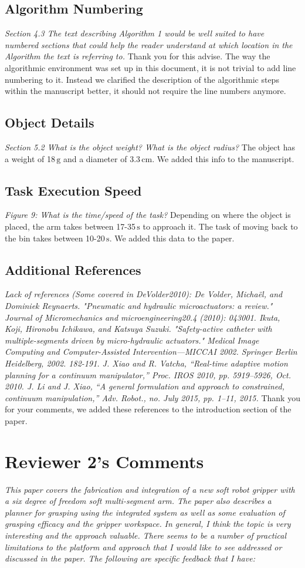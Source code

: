 \documentclass[letterpaper, 10 pt, twocolumn, conference]{article}
\newcommand{\unit}[1]{\ensuremath{\, \mathrm{#1}}} %
\begin{document}
\subsection{Algorithm Numbering}
\textit{Section 4.3 The text describing Algorithm 1 would be well suited to have numbered sections that could help the reader understand at which location in the Algorithm the text is referring to.}
%
Thank you for this advise. The way the algorithmic environment was set up in this document, it is not trivial to add line numbering to it. Instead we clarified the description of the algorithmic steps within the manuscript better, it should not require the line numbers anymore. 
%
\subsection{Object Details}
\textit{Section 5.2 What is the object weight? What is the object radius?}
%
The object has a weight of 18\unit{g} and a diameter of 3.3\unit{cm}. We added this info to the manuscript.
%
\subsection{Task Execution Speed}
\textit{Figure 9: What is the time/speed of the task?}
%
Depending on where the object is placed, the arm takes between 17-35\unit{s} to approach it. The task of moving back to the bin takes between 10-20\unit{s}. We added this data to the paper. 
%
\subsection{Additional References}
%
\textit{Lack of references (Some covered in DeVolder2010):
De Volder, Michaël, and Dominiek Reynaerts. "Pneumatic and hydraulic microactuators: a review." Journal of Micromechanics and microengineering20.4 (2010): 043001.
Ikuta, Koji, Hironobu Ichikawa, and Katsuya Suzuki. "Safety-active catheter with multiple-segments driven by micro-hydraulic actuators." Medical Image Computing and Computer-Assisted Intervention—MICCAI 2002. Springer Berlin Heidelberg, 2002. 182-191.
J. Xiao and R. Vatcha, “Real-time adaptive motion planning for a continuum manipulator,” Proc. IROS 2010, pp. 5919–5926, Oct. 2010.
J. Li and J. Xiao, “A general formulation and approach to constrained, continuum manipulation,” Adv. Robot., no. July 2015, pp. 1–11, 2015.}
%
Thank you for your comments, we added these references to the introduction section of the paper.
%
%
\section{Reviewer 2's Comments}
%
\textit{This paper covers the fabrication and integration of a new soft robot gripper with a six degree of freedom soft multi-segment arm. The paper also describes a planner for grasping using the integrated system as well as some evaluation of grasping efficacy and the gripper workspace.}
%
\textit{In general, I think the topic is very interesting and the approach valuable. There seems to be a number of practical limitations to the platform and approach that I would like to see addressed or discussed in the paper. The following are specific feedback that I have:}
%
\end{document}
